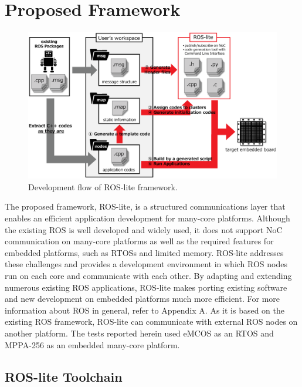 \chapter{Proposed Framework}
\label{chap:proposed_framework}

\begin{figure}[thbp]
  \centering
  \includegraphics[width=0.9\linewidth]{../figure/roslite/system_model.eps}
  \caption{\label{fig:rosl_system_model}
    Development flow of ROS-lite framework.}
\end{figure}

The proposed framework, ROS-lite, is a structured communications layer that enables an efficient application development for many-core platforms.
Although the existing ROS is well developed and widely used, it does not support NoC communication on many-core platforms as well as the required features for embedded platforms, such as RTOSs and limited memory.
ROS-lite addresses these challenges and provides a development environment in which ROS nodes run on each core and communicate with each other.
By adapting and extending numerous existing ROS applications, ROS-lite makes porting existing software and new development on embedded platforms much more efficient.
For more information about ROS in general, refer to Appendix A.
As it is based on the existing ROS framework, ROS-lite can communicate with external ROS nodes on another platform.
The tests reported herein used eMCOS as an RTOS and MPPA-256 as an embedded many-core platform.

\section{ROS-lite Toolchain}
\label{sec:toolchain}

